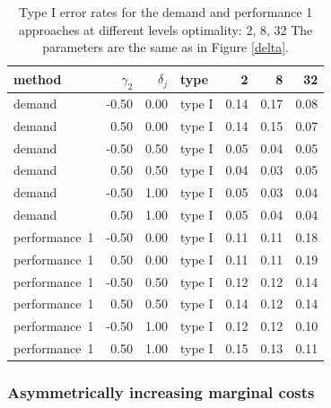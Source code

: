 \documentclass[12pt]{article}
\begin{document}
\begin{table}[ht]
\centering
\begingroup\footnotesize
\begin{tabular}{lrrlrrr}
  \hline
method & $\gamma_2$ & $\delta_{j}$ & type & 2 & 8 & 32 \\
  \hline
demand & -0.50 & 0.00 & type I & 0.14 & 0.17 & 0.08 \\
  demand & 0.50 & 0.00 & type I & 0.14 & 0.15 & 0.07 \\
  demand & -0.50 & 0.50 & type I & 0.05 & 0.04 & 0.05 \\
  demand & 0.50 & 0.50 & type I & 0.04 & 0.03 & 0.05 \\
  demand & -0.50 & 1.00 & type I & 0.05 & 0.03 & 0.04 \\
  demand & 0.50 & 1.00 & type I & 0.05 & 0.04 & 0.04 \\
  performance~1 & -0.50 & 0.00 & type I & 0.11 & 0.11 & 0.18 \\
  performance~1 & 0.50 & 0.00 & type I & 0.11 & 0.11 & 0.19 \\
  performance~1 & -0.50 & 0.50 & type I & 0.12 & 0.12 & 0.14 \\
  performance~1 & 0.50 & 0.50 & type I & 0.14 & 0.12 & 0.14 \\
  performance~1 & -0.50 & 1.00 & type I & 0.12 & 0.12 & 0.10 \\
  performance~1 & 0.50 & 1.00 & type I & 0.15 & 0.13 & 0.11 \\
   \hline
\end{tabular}
\endgroup
\caption[Error Rate and Power with Different Levels of Marginal Costs]{ Type I error rates for the demand and performance 1
approaches at different levels optimality: 2, 8, 32 The parameters are the same
as in Figure \ref{delta}.}
\label{delta-error}
\end{table}

\subsubsection{Asymmetrically increasing marginal
costs}\label{asymmetrically-increasing-marginal-costs}
\end{document}
